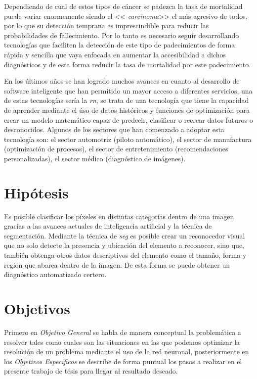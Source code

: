 Dependiendo de cual de estos tipos de cáncer se padezca la tasa de mortalidad puede variar enormemente siendo el << \emph{carcinoma}>> el más agresivo de todos, por lo que su detección temprana es imprescindible para reducir las probabilidades de fallecimiento. Por lo tanto es necesario seguir desarrollando tecnologías que faciliten la detección de este tipo de padecimientos de forma rápida y sencilla que vaya enfocada en aumentar la accesibilidad a dichos diagnósticos y de esta forma reducir la tasa de mortalidad por este padecimiento.

En los últimos años se han logrado muchos avances en cuanto al desarrollo de software inteligente que han permitido un mayor acceso a diferentes servicios, una de estas tecnologías sería la \emph{\gls{rn}}, se trata de una tecnología que tiene la capacidad de aprender mediante el úso de datos históricos y funciones de optimización para crear un modelo matemático capaz de predecir, clasificar o recrear datos futuros o desconocidos. Algunos de los sectores que han comenzado a adoptar esta tecnología son: el sector automotriz (piloto automático), el sector de manufactura (optimización de procesos), el sector de entretenimiento (recomendaciones personalizadas), el sector médico (diagnóstico de imágenes). 


\section{Hipótesis}
Es posible clasificar los píxeles en distintas categorías dentro de una imagen gracias a las avances actuales de inteligencia artificial y la técnica de segmentación. Mediante la técnica de \emph{\gls{seg}} es posible crear un reconocedor visual que no solo detecte la presencia y ubicación del elemento a reconocer, sino que, también obtenga otros datos descriptivos del elemento como el tamaño, forma y región que abarca dentro de la imagen. De esta forma se puede obtener un diagnóstico automatizado certero.
\section{Objetivos}
Primero en \emph{Objetivo General} se habla de manera conceptual la problemática a resolver tales como cuales son las situaciones en las que podemos optimizar la resolución de un problema mediante el uso de la red neuronal, posteriormente en los \emph{Objetivos Específicos} se describe de forma puntual los pasos a realizar en el presente trabajo de tésis para llegar al resultado deseado.

